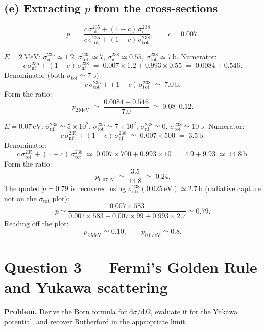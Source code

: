 \documentclass[11pt]{article}
\newcommand{\de}{\mathrm{d}}
\begin{document}
\subsection*{(e) Extracting $p$ from the cross-sections}

\begin{equation}
p\;=\;\frac{c\,\sigma_\text{nf}^{235}+(1-c)\,\sigma_\text{nf}^{238}}{c\,\sigma_\text{tot}^{235}+(1-c)\,\sigma_\text{tot}^{238}},\qquad c=0.007.
\label{eq:p-formula}
\end{equation}

$E=2\,\text{MeV}$: $\sigma_\text{nf}^{235}\simeq 1.2$, $\sigma_\text{tot}^{235}\simeq 7$, $\sigma_\text{nf}^{238}\simeq 0.55$, $\sigma_\text{tot}^{238}\simeq 7\,\text{b}$. Numerator:
\[
c\,\sigma_\text{nf}^{235}+(1-c)\,\sigma_\text{nf}^{238}\;=\;0.007\times 1.2+0.993\times 0.55\;=\;0.0084+0.546.
\]
Denominator (both $\sigma_\text{tot}\simeq 7\,\text{b}$):
\[
c\,\sigma_\text{tot}^{235}+(1-c)\,\sigma_\text{tot}^{238}\;\simeq\;7.0\,\text{b}.
\]
Form the ratio:
\[
p_{2\,\text{MeV}}\;\simeq\;\frac{0.0084+0.546}{7.0}\;\simeq\;0.08\text{--}0.12.
\]

$E=0.07\,\text{eV}$: $\sigma_\text{nf}^{235}\simeq 5\times10^{2}$, $\sigma_\text{tot}^{235}\simeq 7\times10^{2}$, $\sigma_\text{nf}^{238}\simeq 0$, $\sigma_\text{tot}^{238}\simeq 10\,\text{b}$. Numerator:
\[
c\,\sigma_\text{nf}^{235}+(1-c)\,\sigma_\text{nf}^{238}\;\simeq\;0.007\times 500\;=\;3.5\,\text{b}.
\]
Denominator:
\[
c\,\sigma_\text{tot}^{235}+(1-c)\,\sigma_\text{tot}^{238}\;\simeq\;0.007\times 700+0.993\times 10\;=\;4.9+9.93\;\simeq\;14.8\,\text{b}.
\]
Form the ratio:
\[
p_{0.07\,\text{eV}}\;\simeq\;\frac{3.5}{14.8}\;\simeq\;0.24.
\]
The quoted $p=0.79$ is recovered using $\sigma_\text{abs}^{238}(0.025\,\text{eV})\simeq 2.7\,\text{b}$ (radiative capture not on the $\sigma_\text{tot}$ plot):
\[
p\simeq\frac{0.007\times 583}{0.007\times 583+0.007\times 99+0.993\times 2.7}\simeq 0.79.
\]
Reading off the plot:
\begin{equation}
\boxed{\;p_{2\,\text{MeV}}\simeq 0.10,\qquad p_{0.07\,\text{eV}}\simeq 0.8.\;}
\end{equation}

\section*{Question 3 --- Fermi's Golden Rule and Yukawa scattering}

\textbf{Problem.} Derive the Born formula for $\de\sigma/\de\Omega$, evaluate it for the Yukawa potential, and recover Rutherford in the appropriate limit.
\end{document}
